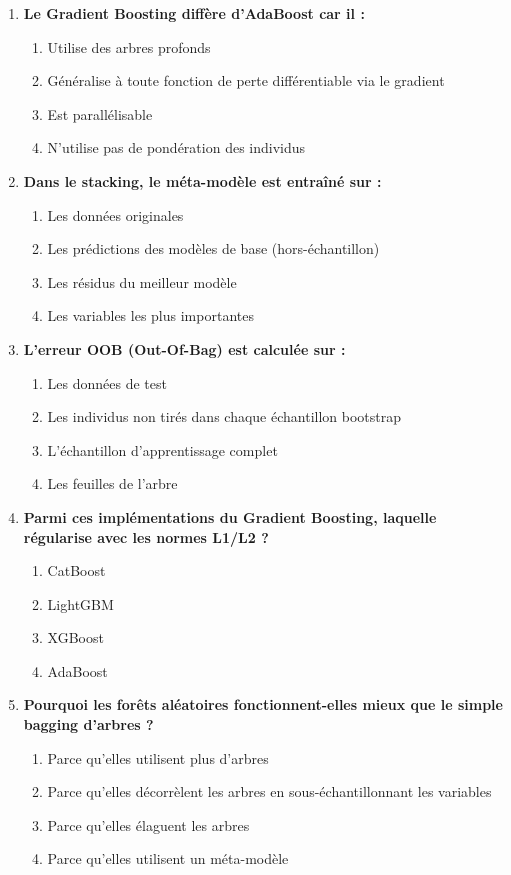 \documentclass[a4paper,11pt]{article}
\begin{document}
\begin{enumerate}
    \item \textbf{Le Gradient Boosting diffère d'AdaBoost car il :}
    \begin{enumerate}
        \item Utilise des arbres profonds
        \item Généralise à toute fonction de perte différentiable via le gradient
        \item Est parallélisable
        \item N'utilise pas de pondération des individus
    \end{enumerate}

    \item \textbf{Dans le stacking, le méta-modèle est entraîné sur :}
    \begin{enumerate}
        \item Les données originales
        \item Les prédictions des modèles de base (hors-échantillon)
        \item Les résidus du meilleur modèle
        \item Les variables les plus importantes
    \end{enumerate}

    \item \textbf{L'erreur OOB (Out-Of-Bag) est calculée sur :}
    \begin{enumerate}
        \item Les données de test
        \item Les individus non tirés dans chaque échantillon bootstrap
        \item L'échantillon d'apprentissage complet
        \item Les feuilles de l'arbre
    \end{enumerate}

    \item \textbf{Parmi ces implémentations du Gradient Boosting, laquelle régularise avec les normes L1/L2 ?}
    \begin{enumerate}
        \item CatBoost
        \item LightGBM
        \item XGBoost
        \item AdaBoost
    \end{enumerate}

    \item \textbf{Pourquoi les forêts aléatoires fonctionnent-elles mieux que le simple bagging d'arbres ?}
    \begin{enumerate}
        \item Parce qu'elles utilisent plus d'arbres
        \item Parce qu'elles décorrèlent les arbres en sous-échantillonnant les variables
        \item Parce qu'elles élaguent les arbres
        \item Parce qu'elles utilisent un méta-modèle
    \end{enumerate}
\end{enumerate}
\end{document}
